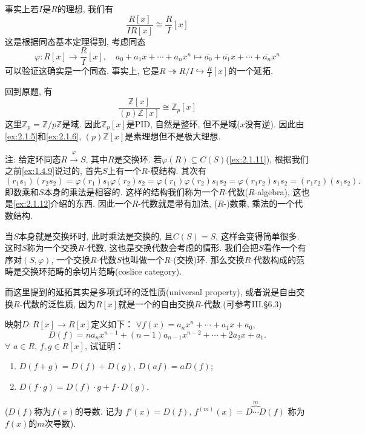 \begin{solution}
    事实上若$I$是$R$的理想, 我们有
\[
    \frac{R[x]}{IR[x]} \cong \frac{R}{I}[x]
\]
这是根据同态基本定理得到, 考虑同态
\[
    \varphi: R[x] \to \frac{R}{I}[x],\quad a_0 + a_1x + \cdots + a_nx^n \mapsto \overline{a_0} + \overline{a_1}x + \cdots + \overline{a_n}x^n
\]
可以验证这确实是一个同态. 事实上, 它是$R \twoheadrightarrow R/I \hookrightarrow \frac{R}{I}[x]$的一个延拓.

回到原题, 有
\[
    \frac{\mathbb{Z}[x]}{(p)\mathbb{Z}[x]} \cong \mathbb{Z}_p[x]
\]
这里$\mathbb{Z}_p = \mathbb{Z}/p\mathbb{Z}$是域. 因此$\mathbb{Z}_p[x]$是PID, 自然是整环, 但不是域($x$没有逆). 因此由\ref{ex:2.1.5}和\ref{ex:2.1.6}, $(p)\mathbb{Z}[x]$是素理想但不是极大理想.

注: 给定环同态$R \overset{\varphi}\to S$, 其中$R$是交换环. 若$\varphi(R) \subseteq C(S)$(\ref{ex:2.1.11}), 根据我们之前\ref{ex:1.4.9}说过的, 首先$S$上有一个$R$-模结构. 其次有
\[
    (r_1s_1)(r_2s_2) = \varphi(r_1)s_1\varphi(r_2)s_2 = \varphi(r_1)\varphi(r_2)s_1s_2 = \varphi(r_1r_2)s_1s_2 = (r_1r_2)(s_1s_2).
\]
即数乘和$S$本身的乘法是相容的. 这样的结构我们称为一个$R$-代数($R$-algebra), 这也是\ref{ex:2.1.12}介绍的东西. 因此一个$R$-代数就是带有加法, ($R$-)数乘, 乘法的一个代数结构.

当$S$本身就是交换环时, 此时乘法是交换的, 且$C(S) = S$, 这样会变得简单很多. 这时$S$称为一个交换$R$-代数, 这也是交换代数会考虑的情形. 我们会把$S$看作一个有序对$(S, \varphi)$, 一个交换$R$-代数$S$也叫做一个$R$-(交换)环. 那么交换$R$-代数构成的范畴是交换环范畴的余切片范畴(coslice category).

而这里提到的延拓其实是多项式环的泛性质(universal property), 或者说是自由交换$R$-代数的泛性质, 因为$R[x]$就是一个的自由交换$R$-代数.(可参考\cite{aluffi2009algebra}III.\S6.3)
\end{solution}

\begin{problem}\label{ex:2.1.9}
    映射$D:R[x] \longrightarrow R[x]$定义如下：
$\forall f(x) = a_nx^n + \cdots + a_1x + a_0$,
\[
    D(f) = na_nx^{n - 1} + (n - 1)a_{n - 1}x^{n - 2} + \cdots + 2a_2x + a_1.
\]
$\forall$ $a \in R$, $f, g \in R[x]$, 试证明：
\begin{enumerate}[(1)]
    \item $D(f + g) = D(f) + D(g)$, $D(af) = aD(f)$;
    \item $D(f \cdot g) = D(f) \cdot g + f \cdot D(g)$.
\end{enumerate}
($D(f)$称为$f(x)$的导数. 记为
$f'(x) = D(f),\, f^{(m)}(x) = \overset{m}{\widehat{D \cdots D}}(f)$
称为$f(x)$的$m$次导数).
\end{problem}

